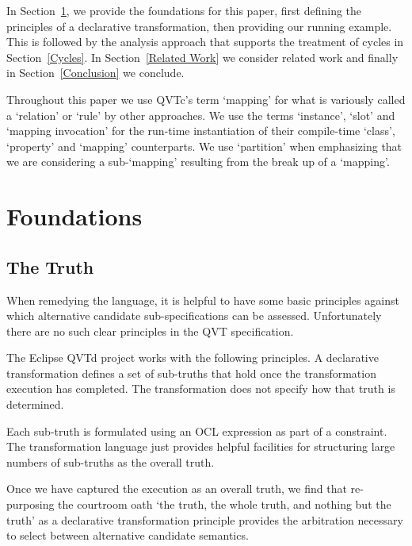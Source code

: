 \documentclass{jot}
\begin{document}
In Section~\ref{Foundations}, we provide the foundations for this paper, first defining the principles of a declarative transformation, then providing our running example. This is  followed by the analysis approach that supports the treatment of cycles in Section~\ref{Cycles}. In Section~\ref{Related Work} we consider related work and finally in Section~\ref{Conclusion} we conclude.

Throughout this paper we use QVTc's term `mapping' for what is variously called a `relation' or `rule' by other approaches. We use the terms `instance', `slot' and `mapping invocation' for the run-time instantiation of their compile-time `class', `property' and `mapping' counterparts. We use `partition' when emphasizing that we are considering a sub-`mapping' resulting from the break up of a `mapping'.

\section{Foundations}\label{Foundations}

\subsection{The Truth}

When remedying the language, it is helpful to have some basic principles against which alternative candidate sub-specifications can be assessed. Unfortunately there are no such clear principles in the QVT specification.

The Eclipse QVTd project works with the following principles. A declarative transformation defines a set of sub-truths that hold once the transformation execution has completed. The transformation does not specify how that truth is determined.

Each sub-truth is formulated using an OCL expression \cite{OCL-2.4} as part of a constraint. The transformation language just provides helpful facilities for structuring large numbers of sub-truths as the overall truth.

Once we have captured the execution as an overall truth, we find that re-purposing the courtroom oath `the truth, the whole truth, and nothing but the truth' as a declarative transformation principle provides the arbitration necessary to select between alternative candidate semantics.

\end{document}
